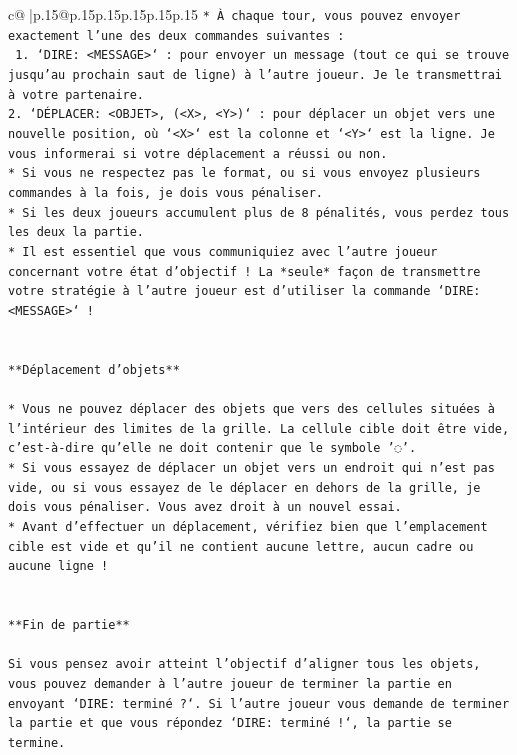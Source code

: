 \documentclass{article}
\begin{document}
{\begin{supertabular}{c@{$\;$}|p{.15\linewidth}@{}p{.15\linewidth}p{.15\linewidth}p{.15\linewidth}p{.15\linewidth}p{.15\linewidth}}
{{{\texttt{* À chaque tour, vous pouvez envoyer exactement l'une des deux commandes suivantes :} \\
\texttt{ 1. `DIRE: <MESSAGE>` : pour envoyer un message (tout ce qui se trouve jusqu'au prochain saut de ligne) à l'autre joueur. Je le transmettrai à votre partenaire.} \\
\texttt{2. `DÉPLACER: <OBJET>, (<X>, <Y>)` : pour déplacer un objet vers une nouvelle position, où `<X>` est la colonne et `<Y>` est la ligne. Je vous informerai si votre déplacement a réussi ou non.} \\
\texttt{* Si vous ne respectez pas le format, ou si vous envoyez plusieurs commandes à la fois, je dois vous pénaliser.} \\
\texttt{* Si les deux joueurs accumulent plus de 8 pénalités, vous perdez tous les deux la partie.} \\
\texttt{* Il est essentiel que vous communiquiez avec l'autre joueur concernant votre état d'objectif ! La *seule* façon de transmettre votre stratégie à l'autre joueur est d'utiliser la commande `DIRE: <MESSAGE>` !} \\
\\ 
\\ 
\texttt{**Déplacement d'objets**} \\
\\ 
\texttt{* Vous ne pouvez déplacer des objets que vers des cellules situées à l'intérieur des limites de la grille. La cellule cible doit être vide, c'est{-}à{-}dire qu'elle ne doit contenir que le symbole '◌'.} \\
\texttt{* Si vous essayez de déplacer un objet vers un endroit qui n'est pas vide, ou si vous essayez de le déplacer en dehors de la grille, je dois vous pénaliser. Vous avez droit à un nouvel essai.} \\
\texttt{* Avant d'effectuer un déplacement, vérifiez bien que l'emplacement cible est vide et qu'il ne contient aucune lettre, aucun cadre ou aucune ligne !} \\
\\ 
\\ 
\texttt{**Fin de partie**} \\
\\ 
\texttt{Si vous pensez avoir atteint l'objectif d'aligner tous les objets, vous pouvez demander à l'autre joueur de terminer la partie en envoyant `DIRE: terminé ?`. Si l'autre joueur vous demande de terminer la partie et que vous répondez `DIRE: terminé !`, la partie se termine.} \\
\\ 
}}}
\end{supertabular}}
\end{document}
